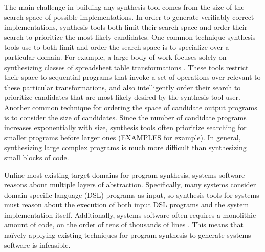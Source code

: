 The main challenge in building any synthesis tool comes from the size of the
search space of possible implementations.
In order to generate verifiably correct implementations, synthesis tools both limit
their search space and order their search to prioritize the most likely candidates.
One common technique synthesis tools use to both limit and order the search space is
to specialize over a particular domain.
For example, a large body of work focuses solely on synthesizing classes of spreadsheet
table transformations .
These tools restrict their space to sequential programs that invoke a set
of operations over relevant to these particular transformations, and also intelligently
order their search to prioritize candidates that are most likely desired by the synthesis
tool user.
Another common technique for ordering the space of candidate output programs is to
consider the size of candidates.
Since the number of candidate programs increases exponentially with size,
synthesis tools often prioritize searching for smaller programs before larger ones
(EXAMPLES for example).
In general, synthesizing large complex programs is much more difficult than
synthesizing small blocks of code.


Unline most existing target domains for program synthesis, systems software reasons
about multiple layers of abstraction.
Specifically, many systems consider domain-specific language (DSL) programs as input,
so synthesis tools for systems must reason about the execution of both input DSL programs
and the system implementation itself.
Additionally, systems software
often requires a monolithic amount of code, on the order of tens of thousands
of lines .
This means that na\"ively applying existing techniques for program synthesis to generate
systems software is infeasible.

